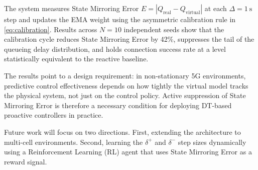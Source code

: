 \documentclass[conference]{IEEEtran}
\newcommand{\qreal}{Q_{\mathrm{real}}}
\newcommand{\qvirt}{Q_{\mathrm{virtual}}}
\begin{document}
The system measures State Mirroring Error $E = |\qreal - \qvirt|$ at each $\Delta = 1\ \mathrm{s}$ step and updates the EMA weight using the asymmetric calibration rule in \eqref{eq:calibration}. Results across $N=10$ independent seeds show that the calibration cycle reduces State Mirroring Error by 42\%, suppresses the tail of the queueing delay distribution, and holds connection success rate at a level statistically equivalent to the reactive baseline.

The results point to a design requirement: in non-stationary 5G environments, predictive control effectiveness depends on how tightly the virtual model tracks the physical system, not just on the control policy. Active suppression of State Mirroring Error is therefore a necessary condition for deploying DT-based proactive controllers in practice.

Future work will focus on two directions. First, extending the architecture to multi-cell environments. Second, learning the $\delta^{+}$ and $\delta^{-}$ step sizes dynamically using a Reinforcement Learning (RL) agent that uses State Mirroring Error as a reward signal.
\end{document}
